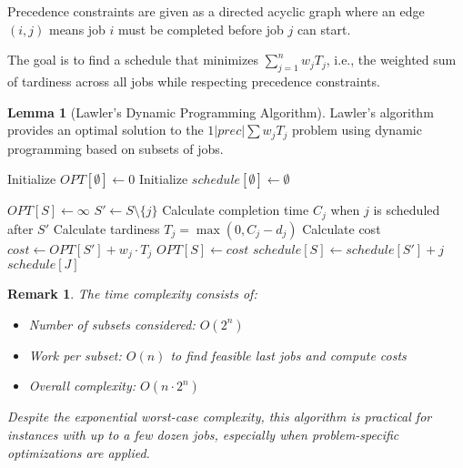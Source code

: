 \documentclass{article}
\newtheorem{remark}{Remark}
\theoremstyle{definition}
\newtheorem{lemma}{Lemma}
\begin{document}
Precedence constraints are given as a directed acyclic graph where an edge $(i, j)$ means job $i$ must be completed before job $j$ can start.

The goal is to find a schedule that minimizes $\sum_{j=1}^{n} w_jT_j$, i.e., the weighted sum of tardiness across all jobs while respecting precedence constraints.

\begin{lemma}[Lawler's Dynamic Programming Algorithm]
Lawler's algorithm provides an optimal solution to the $1|prec|\sum w_jT_j$ problem using dynamic programming based on subsets of jobs.

\begin{algorithm}
\caption{Lawler's Dynamic Programming Algorithm}
\begin{algorithmic}[1]
    \State Initialize $OPT[\emptyset] \gets 0$ 
    \State Initialize $schedule[\emptyset] \gets \emptyset$ 
    
     
            \State $OPT[S] \gets \infty$ 
                \State $S' \gets S \setminus \{j\}$ 
                \State Calculate completion time $C_j$ when $j$ is scheduled after $S'$
                \State Calculate tardiness $T_j = \max(0, C_j - d_j)$
                \State Calculate cost $cost \gets OPT[S'] + w_j \cdot T_j$
                    \State $OPT[S] \gets cost$ 
                    \State $schedule[S] \gets schedule[S'] + j$ 
                \EndIf
            \EndFor
        \EndFor
    \EndFor
    \State \Return $schedule[J]$ 
\EndProcedure
\end{algorithmic}
\end{algorithm}

\begin{remark}
The time complexity consists of:
\begin{itemize}
    \item Number of subsets considered: $O(2^n)$
    \item Work per subset: $O(n)$ to find feasible last jobs and compute costs
    \item Overall complexity: $O(n \cdot 2^n)$
\end{itemize}

Despite the exponential worst-case complexity, this algorithm is practical for instances with up to a few dozen jobs, especially when problem-specific optimizations are applied.
\end{remark}
\end{lemma}
\end{document}

